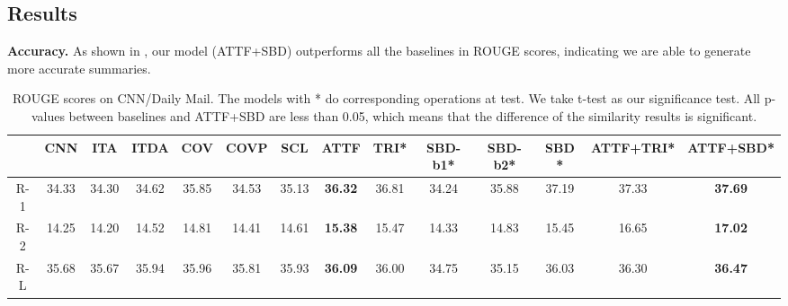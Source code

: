\subsection{Results}
\label{sec:result}

\textbf{Accuracy.} As shown in , 
our model (ATTF+SBD) outperforms all the baselines in ROUGE scores, 
indicating we are able to generate more
accurate summaries. 

\begin{table}[th]
\scriptsize
	\centering
	\begin{tabular}{|c|ccccccc|cccccc|}
		\hline
	            & CNN  & ITA & ITDA & COV & COVP & SCL & ATTF & TRI* & SBD-b1* & SBD-b2* & SBD *& ATTF+TRI* & ATTF+SBD* \\
		\hline
		R-1 & 34.33 & 34.30 & 34.62 & 35.85 & 34.53 & 35.13 & \bf 36.32 & 36.81 & 34.24 & 35.88 & 37.19 & 37.33 &\bf 37.69 \\
		R-2 & 14.25 & 14.20 & 14.52 & 14.81 & 14.41 & 14.61 & \bf 15.38 & 15.47 & 14.33 & 14.83 & 15.45 & 16.65 & \bf 17.02\\
		R-L & 35.68 & 35.67 & 35.94 & 35.96 & 35.81 & 35.93 & \bf 36.09 & 36.00 & 34.75 & 35.15 & 36.03 & 36.30 & \bf 36.47\\
		\hline
	\end{tabular}
	\caption{ROUGE scores on CNN/Daily Mail. The models with * do corresponding operations at test.
We take t-test 
as our significance test.
All p-values between baselines and ATTF+SBD are less than 0.05,
which means that the difference of the similarity results is significant. 
	}
	\label{tab:eval_main}
\end{table}

